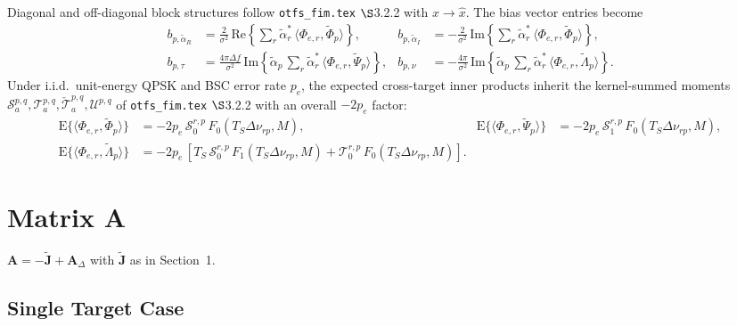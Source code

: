 \documentclass[11pt]{article}
\begin{document}
Diagonal and off-diagonal block structures follow \texttt{otfs\_fim.tex} \(\S\)3.2.2 with \(x \to \hat{x}\). The bias vector entries become
\begin{align}
    b_{p, \tilde{\alpha}_R} &= \tfrac{2}{\sigma^2}\, \mathrm{Re}\!\left\{ \sum_r \tilde{\alpha}_r^*\, \langle \Phi_{e,r}, \tilde{\Phi}_p\rangle \right\}, &
    b_{p, \tilde{\alpha}_I} &= -\tfrac{2}{\sigma^2}\, \mathrm{Im}\!\left\{ \sum_r \tilde{\alpha}_r^*\, \langle \Phi_{e,r}, \tilde{\Phi}_p\rangle \right\}, \\
    b_{p, \tau} &= \tfrac{4\pi\Delta f}{\sigma^2}\, \mathrm{Im}\!\left\{ \tilde{\alpha}_p\, \sum_r \tilde{\alpha}_r^*\, \langle \Phi_{e,r}, \tilde{\Psi}_p\rangle \right\}, &
    b_{p, \nu} &= -\tfrac{4\pi}{\sigma^2}\, \mathrm{Im}\!\left\{ \tilde{\alpha}_p\, \sum_r \tilde{\alpha}_r^*\, \langle \Phi_{e,r}, \tilde{\Lambda}_p\rangle \right\}.
\end{align}
Under i.i.d.\ unit-energy QPSK and BSC error rate \(p_e\), the expected cross-target inner products inherit the kernel-summed moments \(\mathcal{S}_a^{p,q}, \mathcal{T}_a^{p,q}, \check{\mathcal{T}}_a^{p,q}, \mathcal{U}^{p,q}\) of \texttt{otfs\_fim.tex} \(\S\)3.2.2 with an overall \(-2 p_e\) factor:
\begin{align}
    \mathrm{E}\{\langle \Phi_{e,r}, \tilde{\Phi}_p\rangle\} &= -2p_e\, \mathcal{S}_0^{r,p}\, F_0(T_S\Delta\nu_{rp}, M), &
    \mathrm{E}\{\langle \Phi_{e,r}, \tilde{\Psi}_p\rangle\} &= -2p_e\, \mathcal{S}_1^{r,p}\, F_0(T_S\Delta\nu_{rp}, M), \\
    \mathrm{E}\{\langle \Phi_{e,r}, \tilde{\Lambda}_p\rangle\} &= -2p_e\, \left[ T_S\, \mathcal{S}_0^{r,p}\, F_1(T_S\Delta\nu_{rp}, M) + \mathcal{T}_0^{r,p}\, F_0(T_S\Delta\nu_{rp}, M) \right]. & &
\end{align}

\section{Matrix A}

\(\bm{A} = -\tilde{\bm{J}} + \bm{A}_\Delta\) with \(\tilde{\bm{J}}\) as in Section~1.

\subsection{Single Target Case}
\end{document}
